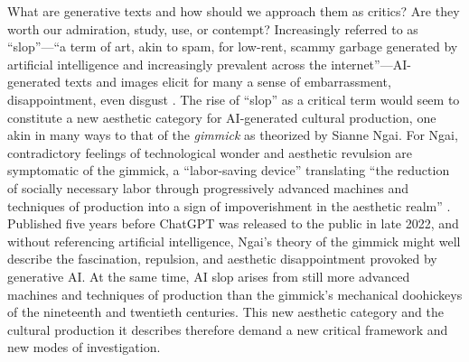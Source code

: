 \documentclass{simple-humanities}         %
\begin{document}
What are generative texts and how should we approach them as critics?
Are they worth our admiration, study, use, or contempt?
Increasingly referred to as ``slop''---``a term of art, akin to spam, for low-rent, scammy garbage generated by artificial intelligence and increasingly prevalent across the internet''---AI-generated texts and images elicit for many a sense of embarrassment, disappointment, even disgust \parencite{readDrowningSlop2024}.
The rise of ``slop'' as a critical term would seem to constitute a new aesthetic category for AI-generated cultural production, one akin in many ways to that of the \emph{gimmick} as theorized by Sianne Ngai.
For Ngai, contradictory feelings of technological wonder and aesthetic revulsion are symptomatic of the gimmick, a ``labor-saving device'' translating ``the reduction of socially necessary labor through progressively advanced machines and techniques of production into a sign of impoverishment in the aesthetic realm'' \parencite[55]{ngaiTheoryGimmickAesthetic2020}.
Published five years before ChatGPT was released to the public in late 2022, and without referencing artificial intelligence, Ngai's theory of the gimmick might well describe the fascination, repulsion, and aesthetic disappointment provoked by generative AI.
At the same time, AI slop arises from still more advanced machines and techniques of production than the gimmick's mechanical doohickeys of the nineteenth and twentieth centuries. 
This new aesthetic category and the cultural production it describes therefore demand a new critical framework and new modes of investigation. 
\end{document}

